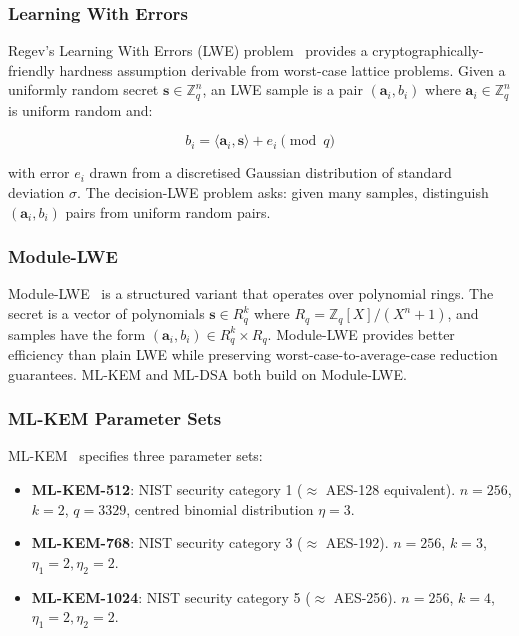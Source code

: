 \documentclass[sigconf,nonacm]{acmart}
\begin{document}
\subsubsection{Learning With Errors}

Regev's Learning With Errors (LWE) problem~\cite{regev2009lwe}
provides a cryptographically-friendly hardness assumption derivable
from worst-case lattice problems. Given a uniformly random secret
$\mathbf{s} \in \mathbb{Z}_q^n$, an LWE sample is a pair
$(\mathbf{a}_i, b_i)$ where $\mathbf{a}_i \in \mathbb{Z}_q^n$ is
uniform random and:

\begin{equation}
  b_i = \langle \mathbf{a}_i, \mathbf{s} \rangle + e_i \pmod{q}
\end{equation}

with error $e_i$ drawn from a discretised Gaussian distribution of
standard deviation $\sigma$. The decision-LWE problem asks: given
many samples, distinguish $(\mathbf{a}_i, b_i)$ pairs from uniform
random pairs.

\subsubsection{Module-LWE}

Module-LWE~\cite{langlois2015moduleworst} is a structured variant
that operates over polynomial rings. The secret is a vector of
polynomials $\mathbf{s} \in R_q^k$ where $R_q = \mathbb{Z}_q[X]/(X^n+1)$,
and samples have the form $(\mathbf{a}_i, b_i) \in R_q^k \times R_q$.
Module-LWE provides better efficiency than plain LWE while preserving
worst-case-to-average-case reduction
guarantees. ML-KEM and ML-DSA both build on Module-LWE.

\subsubsection{ML-KEM Parameter Sets}

ML-KEM~\cite{nist2024fips203} specifies three parameter sets:

\begin{itemize}
  \item \textbf{ML-KEM-512}: NIST security category 1 ($\approx$ AES-128
        equivalent). $n=256$, $k=2$, $q=3329$, centred binomial
        distribution $\eta=3$.
  \item \textbf{ML-KEM-768}: NIST security category 3 ($\approx$ AES-192).
        $n=256$, $k=3$, $\eta_1=2, \eta_2=2$.
  \item \textbf{ML-KEM-1024}: NIST security category 5 ($\approx$ AES-256).
        $n=256$, $k=4$, $\eta_1=2, \eta_2=2$.
\end{itemize}
\end{document}
